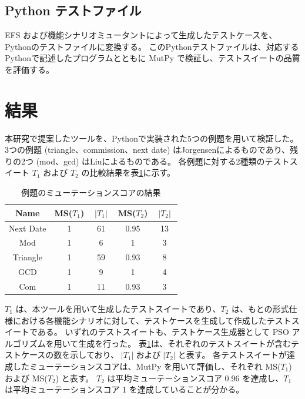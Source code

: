 \documentclass[uplatex, twocolumn, 10pt]{jsarticle} %
\begin{document}
\subsection{Python テストファイル}
EFS および機能シナリオミュータントによって生成したテストケースを、Pythonのテストファイルに変換する。
このPythonテストファイルは、対応するPythonで記述したプログラムとともに MutPy で検証し、テストスイートの品質を評価する。


\section{結果}
\label{sec:result}
本研究で提案したツールを、Pythonで実装された5つの例題を用いて検証した。
3つの例題 (triangle、commission、next date) はJorgensen\cite{8}によるものであり、残りの2つ (mod、gcd) はLiu\cite{9}によるものである。
各例題に対する2種類のテストスイート $T_1$ および $T_2$ の比較結果を表\ref{tab:Mutation_score}に示す。
\begin{table}[t]
    \caption{例題のミューテーションスコアの結果}
    \label{tab:Mutation_score}
    \begin{tabular}{|c|c|c|c|c|}
        \hline
        Name      & MS($T_1$) & $\;\lvert T_1 \rvert\;$ & MS($T_2$) & $\;\lvert T_2 \rvert\;$ \\ \hline
        Next Date & 1         & 61                      & 0.95      & 13                      \\
        Mod       & 1         & 6                       & 1         & 3                       \\
        Triangle  & 1         & 59                      & 0.93      & 8                       \\
        GCD       & 1         & 9                       & 1         & 4                       \\
        Com       & 1         & 11                      & 0.93      & 3                       \\ \hline
    \end{tabular}
\end{table}
$T_1$ は、本ツールを用いて生成したテストスイートであり、$T_2$ は、もとの形式仕様における各機能シナリオに対して、テストケースを生成して作成したテストスイートである。
いずれのテストスイートも、テストケース生成器として PSO アルゴリズムを用いて生成を行った。
表\ref{tab:Mutation_score}は、それぞれのテストスイートが含むテストケースの数を示しており、$\;\lvert T_1 \rvert\;$および$\;\lvert T_2 \rvert\;$と表す。
各テストスイートが達成したミューテーションスコアは、MutPy を用いて評価し、それぞれ MS($T_1$) および MS($T_2$) と表す。
$T_2$ は平均ミューテーションスコア 0.96 を達成し、$T_1$ は平均ミューテーションスコア 1 を達成していることが分かる。
\end{document}
